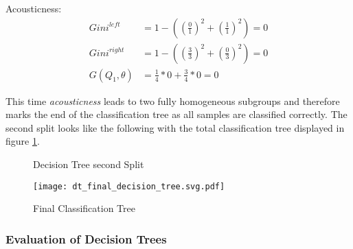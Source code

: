   Acousticness: 
  \begin{equation*}
    \begin{aligned}
        Gini^{left} &= 1 - ((\frac{0}{1})^2 + (\frac{1}{1})^2) = 0
        \\
        Gini^{right}  &= 1 - ((\frac{3}{3})^2 + (\frac{0}{3})^2) = 0
        \\
        G(Q_{1},\theta) &= \frac{1}{4} * 0 + \frac{3}{4} * 0 = 0
\end{aligned}
\end{equation*}

This time \emph{acousticness} leads to two fully homogeneous subgroups and therefore marks the end of the classification tree as all samples are 
classified correctly. The second split looks like the following with the total classification tree displayed in figure \ref{fig:theory_second_split}.

\begin{figure}[H]
    \centering
    \qquad
    \caption{Decision Tree second Split}%
    \label{fig:theory_second_split}%
\end{figure}


\begin{figure}[H]
    \centering
    \caption[]{Final Classification Tree}
	\label{fig:dt_final_decision_tree}
    \texttt{[image: dt\_final\_decision\_tree.svg.pdf]}
\end{figure}

%

\subsubsection{Evaluation of Decision Trees}

